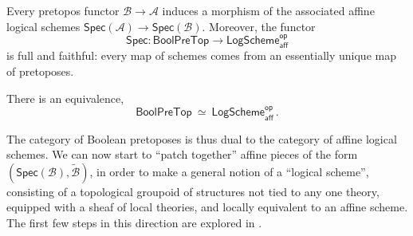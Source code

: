 \documentclass[graybox]{svmult}
\begin{document}
\begin{theorem}
Every pretopos functor $\mathcal{B} \to \mathcal{A}$ induces a morphism of the associated affine logical schemes $\mathsf{Spec}(\mathcal{A}) \to \mathsf{Spec}(\mathcal{B})$.  Moreover, the  functor
\[
\mathsf{Spec} : \mathsf{BoolPreTop} \longrightarrow \mathsf{LogScheme}^{\mathsf{op}}_{\mathsf{aff}}
\]
is full and faithful: every map of schemes comes from an essentially unique map of pretoposes.
\end{theorem}

\begin{corollary}
There is an equivalence,
\[
\mathsf{BoolPreTop} \ \simeq\ \mathsf{LogScheme}^{\mathsf{op}}_{\mathsf{aff}}\,.
\]
\end{corollary}

The category of Boolean pretoposes is thus dual to the category of affine logical schemes.  We can now start to  ``patch together'' affine pieces of the form $(\mathsf{Spec}(\mathcal{B}),\widetilde{\mathcal{B}})$, in order to make a general notion of a ``logical scheme'', consisting of a topological groupoid of structures not tied to any one theory, equipped with a sheaf of local theories, and locally equivalent to an affine scheme.  The first few steps in this direction are explored in \cite{B}.


\end{document}
